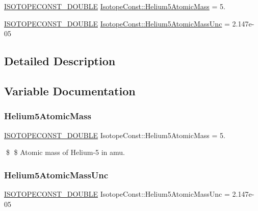 \begin{DoxyCompactItemize}
\item 
\mbox{\hyperlink{group___isotope_const-_macros_ga8f45a7272ce02c0b4c65c44636ed719a}{I\+S\+O\+T\+O\+P\+E\+C\+O\+N\+S\+T\+\_\+\+D\+O\+U\+B\+LE}} \mbox{\hyperlink{group___isotope_const-_helium-_he5_ga14721fff0d30550d1c7087fa28800b64}{Isotope\+Const\+::\+Helium5\+Atomic\+Mass}} = 5.
\item 
\mbox{\hyperlink{group___isotope_const-_macros_ga8f45a7272ce02c0b4c65c44636ed719a}{I\+S\+O\+T\+O\+P\+E\+C\+O\+N\+S\+T\+\_\+\+D\+O\+U\+B\+LE}} \mbox{\hyperlink{group___isotope_const-_helium-_he5_ga050d80e86dd7bf3d02272001c99ec3a3}{Isotope\+Const\+::\+Helium5\+Atomic\+Mass\+Unc}} = 2.\+147e-\/05
\end{DoxyCompactItemize}


\subsection{Detailed Description}


\subsection{Variable Documentation}
\mbox{\label{group___isotope_const-_helium-_he5_ga14721fff0d30550d1c7087fa28800b64}} 
\subsubsection{\texorpdfstring{Helium5\+Atomic\+Mass}{Helium5AtomicMass}}
{\footnotesize\ttfamily \mbox{\hyperlink{group___isotope_const-_macros_ga8f45a7272ce02c0b4c65c44636ed719a}{I\+S\+O\+T\+O\+P\+E\+C\+O\+N\+S\+T\+\_\+\+D\+O\+U\+B\+LE}} Isotope\+Const\+::\+Helium5\+Atomic\+Mass = 5.}

\$ \$ Atomic mass of Helium-\/5 in amu. \mbox{\label{group___isotope_const-_helium-_he5_ga050d80e86dd7bf3d02272001c99ec3a3}} 
\subsubsection{\texorpdfstring{Helium5\+Atomic\+Mass\+Unc}{Helium5AtomicMassUnc}}
{\footnotesize\ttfamily \mbox{\hyperlink{group___isotope_const-_macros_ga8f45a7272ce02c0b4c65c44636ed719a}{I\+S\+O\+T\+O\+P\+E\+C\+O\+N\+S\+T\+\_\+\+D\+O\+U\+B\+LE}} Isotope\+Const\+::\+Helium5\+Atomic\+Mass\+Unc = 2.\+147e-\/05}

